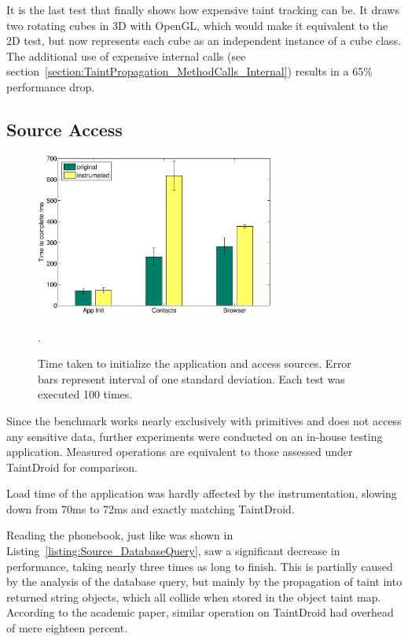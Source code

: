 \documentclass[12pt,twoside,notitlepage]{report}
\begin{document}
It is the last test that finally shows how expensive taint tracking can be. It draws two rotating cubes in 3D with OpenGL, which would make it equivalent to the 2D test, but now represents each cube as an independent instance of a cube class. The additional use of expensive internal calls (see section~\ref{section:TaintPropagation_MethodCalls_Internal}) results in a 65\% performance drop.

\subsection{Source Access}

\begin{figure}
	\centerline{	
		\includegraphics[width=0.7\textwidth]{figs/fig_eval_testappbench.eps}
	}
	\caption{Time taken to initialize the application and access sources. Error bars represent interval of one standard deviation. Each test was executed 100 times.}.
	\label{figure:Evalutaion_TestAppBench}
\end{figure}

Since the benchmark works nearly exclusively with primitives and does not access any sensitive data, further experiments were conducted on an in-house testing application. Measured operations are equivalent to those assessed under TaintDroid for comparison. 

Load time of the application was hardly affected by the instrumentation, slowing down from 70ms to 72ms and exactly matching TaintDroid. 

Reading the phonebook, just like was shown in Listing~\ref{listing:Source_DatabaseQuery}, saw a significant decrease in performance, taking nearly three times as long to finish. This is partially caused by the analysis of the database query, but mainly by the propagation of taint into returned string objects, which all collide when stored in the object taint map. According to the academic paper, similar operation on TaintDroid had overhead of mere eighteen percent. 
\end{document}
